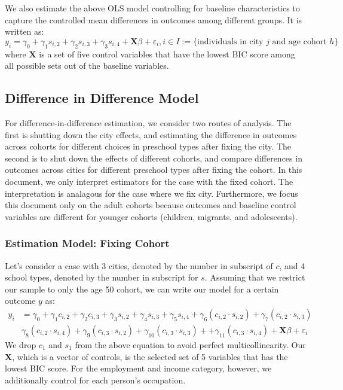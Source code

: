 \documentclass[11pt]{article}
\begin{document}
We also estimate the above OLS model controlling for baseline characteristics to capture the controlled mean differences in outcomes among different groups. It is written as:
\begin{equation} \label{OLS-control}
	y_{i} = \gamma_0 + \gamma_1 s_{i,2} + \gamma_2 s_{i,3} + \gamma_3 s_{i,4} + \mathbf{X}\beta + \varepsilon_{i}, i \in I := \{ \text{individuals in city $j$ and age cohort $h$}\}	
\end{equation}
where $\mathbf{X}$ is a set of five control variables that have the lowest BIC score among all possible sets out of the baseline variables. 


\subsection{Difference in Difference Model}
For difference-in-difference estimation, we consider two routes of analysis. The first is shutting down the city effects, and estimating the difference in outcomes across cohorts for different choices in preschool types after fixing the city. The second is to shut down the effects of different cohorts, and compare differences in outcomes across cities for different preschool types after fixing the cohort. In this document, we only interpret estimators for the case with the fixed cohort. The interpretation is analagous for the case where we fix city. Furthermore, we focus this document only on the adult cohorts because outcomes and baseline control variables are different for younger cohorts (children, migrants, and adolescents). 

\subsubsection{Estimation Model: Fixing Cohort}

Let's consider a case with 3 cities, denoted by the number in subscript of $c$, and 4 school types, denoted by the number in subscript for $s$. Assuming that we restrict our sample to only the age 50 cohort, we can write our model for a certain outcome $y$ as:
\begin{eqnarray}  \label{eq:specific2}
y_i & = \gamma_0 + \gamma_1 c_{i,2} + \gamma_2 c_{i,3} + \gamma_3 s_{i,2} + \gamma_4 s_{i,3} + \gamma_5 s_{i,4}  + \gamma_6 ({c_{i,2}}\cdot{s_{i,2}}) + \gamma_7 ({c_{i,2}}\cdot{s_{i,3}})  \nonumber \\
 & \gamma_8 ({c_{i,2}}\cdot{s_{i,4}}) + \gamma_9 ({c_{i,3}}\cdot{s_{i,2}}) + \gamma_{10} ({c_{i,3}}\cdot{s_{i,3}}) +  + \gamma_{11} ({c_{i,3}}\cdot{s_{i,4}}) + \mathbf{X}\beta + \varepsilon_i  
\end{eqnarray}
We drop $c_1$ and $s_1$ from the above equation to avoid perfect multicollinearity. Our $\mathbf{X}$, which is a vector of controls, is the selected set of 5 variables that has the lowest BIC score. For the employment and income category, however, we additionally control for each person's occupation.
\end{document}
